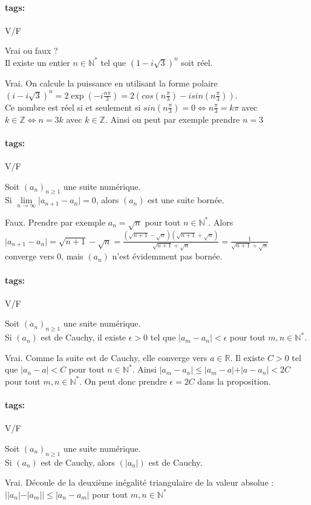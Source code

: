 \documentclass[12pt]{article}
\newcommand*{\xfield}[1]{\begin{mdframed}\centering #1\end{mdframed}\bigskip}
\newenvironment{note}{}{}
\newcommand*{\tags}[1]{\paragraph{tags: }#1}
\begin{document}
\begin{note}
	\tags{V/F}
	\xfield{Vrai ou faux ?\\
	Il existe un entier $n \in \mathbb{N}^*$ tel que $(1-i\sqrt{3})^n$ soit réel.}
	\xfield{Vrai. On calcule la puissance en utilisant la forme polaire\\
	$(i-i\sqrt{3})^n = 2 \exp{(-i\frac{n\pi}{3})} = 2\left(cos(n\frac{\pi}{3}) - i sin(n\frac{\pi}{3})\right)$.\\
	Ce nombre est réel si et seulement si $sin(n\frac{\pi}{3}) = 0 \Leftrightarrow n\frac{\pi}{3} = k \pi$ avec $k \in \mathbb{Z} \Leftrightarrow n = 3k$ avec $k \in \mathbb{Z}$. Ainsi on peut par exemple prendre $n=3$}
\end{note}

\begin{note}
\tags{V/F}
	\xfield{Soit $(a_n)_{n\ge 1}$ une suite numérique.\\
	Si $\lim\limits_{n \to \infty} \vert a_{n+1}-a_n \vert = 0$, alors $(a_n)$ est une suite bornée.}
	\xfield{Faux. Prendre par exemple $a_n = \sqrt{n}$ pour tout $n \in \mathbb{N}^*$. Alors\\
	$\vert a_{n+1} - a_n \vert = \sqrt{n+1} - \sqrt{n} = \frac{(\sqrt{n+1} - \sqrt{n})(\sqrt{n+1} + \sqrt{n})}{\sqrt{n+1} + \sqrt{n}} = \frac{1}{\sqrt{n+1} + \sqrt{n}}$\\
	converge vers 0, mais $(a_n)$ n'est évidemment pas bornée.}
\end{note}

\begin{note}
\tags{V/F}
	\xfield{Soit $(a_n)_{n\ge 1}$ une suite numérique.\\
	Si $(a_n)$ est de Cauchy, il existe $\epsilon > 0$ tel que $\vert a_m - a_n \vert < \epsilon$ pour tout $m,n \in \mathbb{N}^*$.}
	\xfield{Vrai. Comme la suite est de Cauchy, elle converge vers $a \in \mathbb{R}$. Il existe $C>0$ tel que $\vert a_n - a \vert < C$ pour tout $n \in \mathbb{N}^*$. Ainsi $\vert a_m - a_n \vert \le \vert a_m - a \vert + \vert a - a_n \vert < 2C$ pour tout $m,n \in \mathbb{N}^*$. On peut donc prendre $\epsilon = 2C$ dans la proposition.}
\end{note}

\begin{note}
\tags{V/F}
	\xfield{Soit $(a_n)_{n\ge 1}$ une suite numérique.\\
	Si $(a_n)$ est de Cauchy, alors $(\vert a_n \vert)$ est de Cauchy. }
	\xfield{Vrai. Découle de la deuxième inégalité triangulaire de la valeur absolue : $\big|\vert a_n \vert - \vert a_m\vert\big| \le \vert a_n - a_m \vert$ pour tout $m,n \in \mathbb{N}^*$}
\end{note}
\end{document}
